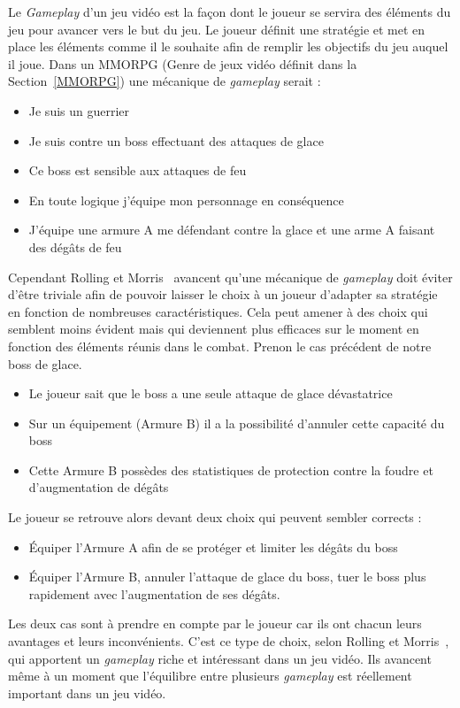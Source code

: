 Le \emph{Gameplay} d'un jeu vidéo est la façon dont le joueur se servira des éléments du jeu pour avancer vers le but du jeu.
Le joueur définit une stratégie et met en place les éléments comme il le souhaite afin de remplir les objectifs du jeu auquel il joue.
Dans un MMORPG (Genre de jeux vidéo définit dans la Section~\ref{MMORPG}) une mécanique de \emph{gameplay} serait :
\begin{itemize}
    \item Je suis un guerrier
    \item Je suis contre un boss effectuant des attaques de glace
    \item Ce boss est sensible aux attaques de feu
    \item En toute logique j'équipe mon personnage en conséquence
    \item J'équipe une armure A me défendant contre la glace et une arme A faisant des dégâts de feu
\end{itemize}
Cependant Rolling et Morris~\cite{Rollings2004} avancent qu'une mécanique de \emph{gameplay} doit éviter d'être triviale afin de pouvoir laisser le choix à un joueur d'adapter sa stratégie en fonction de nombreuses caractéristiques.
Cela peut amener à des choix qui semblent moins évident mais qui deviennent plus efficaces sur le moment en fonction des éléments réunis dans le combat.
Prenon le cas précédent de notre boss de glace.
\begin{itemize}
    \item Le joueur sait que le boss a une seule attaque de glace dévastatrice
    \item Sur un équipement (Armure B) il a la possibilité d'annuler cette capacité du boss
    \item Cette Armure B possèdes des statistiques de protection contre la foudre et d'augmentation de dégâts
\end{itemize}
Le joueur se retrouve alors devant deux choix qui peuvent sembler corrects :
\begin{itemize}
    \item Équiper l'Armure A afin de se protéger et limiter les dégâts du boss
    \item Équiper l'Armure B, annuler l'attaque de glace du boss, tuer le boss plus rapidement avec l'augmentation de ses dégâts. 
\end{itemize}
Les deux cas sont à prendre en compte par le joueur car ils ont chacun leurs avantages et leurs inconvénients.
C'est ce type de choix, selon Rolling et Morris~\cite{Rollings2004}, qui apportent un \emph{gameplay} riche et intéressant dans un jeu vidéo.
Ils avancent même à un moment que l'équilibre entre plusieurs \emph{gameplay} est réellement important dans un jeu vidéo.

